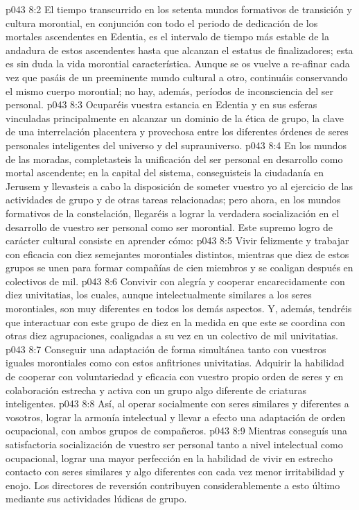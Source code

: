 \vs p043 8:2 El tiempo transcurrido en los setenta mundos formativos de transición y cultura morontial, en conjunción con todo el periodo de dedicación de los mortales ascendentes en Edentia, es el intervalo de tiempo más estable de la andadura de estos ascendentes hasta que alcanzan el estatus de finalizadores; esta es sin duda la vida morontial característica. Aunque se os vuelve a re\hyp{}afinar cada vez que pasáis de un preeminente mundo cultural a otro, continuáis conservando el mismo cuerpo morontial; no hay, además, períodos de inconsciencia del ser personal.
\vs p043 8:3 Ocuparéis vuestra estancia en Edentia y en sus esferas vinculadas principalmente en alcanzar un dominio de la ética de grupo, la clave de una interrelación placentera y provechosa entre los diferentes órdenes de seres personales inteligentes del universo y del suprauniverso.
\vs p043 8:4 En los mundos de las moradas, completasteis la unificación del ser personal en desarrollo como mortal ascendente; en la capital del sistema, conseguisteis la ciudadanía en Jerusem y llevasteis a cabo la disposición de someter vuestro yo al ejercicio de las actividades de grupo y de otras tareas relacionadas; pero ahora, en los mundos formativos de la constelación, llegaréis a lograr la verdadera socialización en el desarrollo de vuestro ser personal como ser morontial. Este supremo logro de carácter cultural consiste en aprender cómo:
\vs p043 8:5 Vivir felizmente y trabajar con eficacia con diez semejantes morontiales distintos, mientras que diez de estos grupos se unen para formar compañías de cien miembros y se coaligan después en colectivos de mil.
\vs p043 8:6 Convivir con alegría y cooperar encarecidamente con diez univitatias, los cuales, aunque intelectualmente similares a los seres morontiales, son muy diferentes en todos los demás aspectos. Y, además, tendréis que interactuar con este grupo de diez en la medida en que este se coordina con otras diez agrupaciones, coaligadas a su vez en un colectivo de mil univitatias.
\vs p043 8:7 Conseguir una adaptación de forma simultánea tanto con vuestros iguales morontiales como con estos anfitriones univitatias. Adquirir la habilidad de cooperar con voluntariedad y eficacia con vuestro propio orden de seres y en colaboración estrecha y activa con un grupo algo diferente de criaturas inteligentes.
\vs p043 8:8 Así, al operar socialmente con seres similares y diferentes a vosotros, lograr la armonía intelectual y llevar a efecto una adaptación de orden ocupacional, con ambos grupos de compañeros.
\vs p043 8:9 Mientras conseguís una satisfactoria socialización de vuestro ser personal tanto a nivel intelectual como ocupacional, lograr una mayor perfección en la habilidad de vivir en estrecho contacto con seres similares y algo diferentes con cada vez menor irritabilidad y enojo. Los directores de reversión contribuyen considerablemente a esto último mediante sus actividades lúdicas de grupo.
